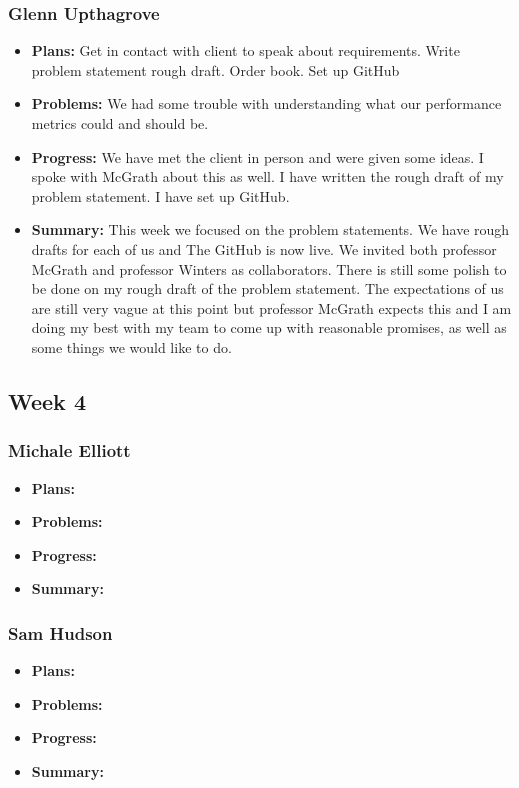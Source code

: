 \documentclass[onecolumn, draftclsnofoot,10pt, compsoc]{IEEEtran}
\begin{document}
\subsubsection{Glenn Upthagrove}
\begin {itemize}
 \item \textbf{Plans: }Get in contact with client to speak about requirements. Write problem statement rough draft. Order book. Set up GitHub
 \item \textbf{Problems: }We had some trouble with understanding what our performance metrics could and should be. 
 \item \textbf{Progress: }We have met the client in person and were given some ideas. I spoke with McGrath about this as well. I have written the rough draft of my problem statement. I have set up GitHub. 
 \item \textbf{Summary: }This week we focused on the problem statements. We have rough drafts for each of us and The GitHub is now live. We invited both professor McGrath and professor Winters as collaborators. There is still some polish to be done on my rough draft of the problem statement. The expectations of us are still very vague at this point but professor McGrath expects this and I am doing my best with my team to come up with reasonable promises, as well as some things we would like to do. 
\end {itemize}
\subsection {Week 4}
\subsubsection{Michale Elliott}
\begin {itemize}
 \item \textbf{Plans: }
 \item \textbf{Problems: }
 \item \textbf{Progress: }
 \item \textbf{Summary: }
\end {itemize}
\subsubsection{Sam Hudson}
\begin {itemize}
 \item \textbf{Plans: }
 \item \textbf{Problems: }
 \item \textbf{Progress: }
 \item \textbf{Summary: }
\end {itemize}
\end{document}
